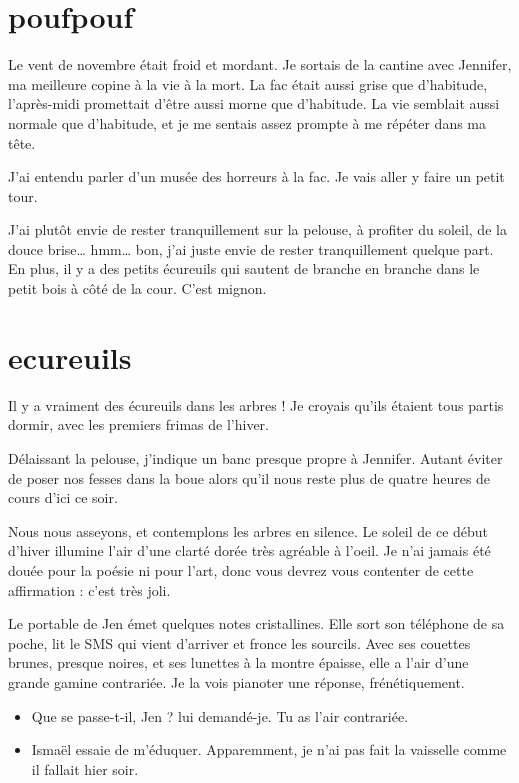 \section{poufpouf}
Le vent de novembre était froid et mordant. Je sortais de la cantine avec Jennifer, ma meilleure copine à la vie à la mort. La fac était aussi grise que d'habitude, l'après-midi promettait d'être aussi morne que d'habitude. La vie semblait aussi normale que d'habitude, et je me sentais assez prompte à me répéter dans ma tête.

\item J'ai entendu parler d'un musée des horreurs à la fac. Je vais aller y faire un petit tour. 
\item J'ai plutôt envie de rester tranquillement sur la pelouse, à profiter du soleil, de la douce brise… hmm… bon, j'ai juste envie de rester tranquillement quelque part. En plus, il y a des petits écureuils qui sautent de branche en branche dans le petit bois à côté de la cour. C'est mignon. 
\enw

\section{ecureuils}

Il y a vraiment des écureuils dans les arbres ! Je croyais qu'ils étaient tous partis dormir, avec les premiers frimas de l'hiver.

Délaissant la pelouse, j'indique un banc presque propre à Jennifer. Autant éviter de poser nos fesses dans la boue alors qu'il nous reste plus de quatre heures de cours d'ici ce soir.

Nous nous asseyons, et contemplons les arbres en silence. Le soleil de ce début d'hiver illumine l'air d'une clarté dorée très agréable à l'oeil. Je n'ai jamais été douée pour la poésie ni pour l'art, donc vous devrez vous contenter de cette affirmation : c'est très joli.

Le portable de Jen émet quelques notes cristallines. Elle sort son téléphone de sa poche, lit le SMS qui vient d'arriver et fronce les sourcils. Avec ses couettes brunes, presque noires, et ses lunettes à la montre épaisse, elle a l'air d'une grande gamine contrariée. Je la vois pianoter une réponse, frénétiquement.

\begin{itemize}
\item Que se passe-t-il, Jen ? lui demandé-je. Tu as l'air contrariée.
\item Ismaël essaie de m'éduquer. Apparemment, je n'ai pas fait la vaisselle comme il fallait hier soir.
\end{itemize}


